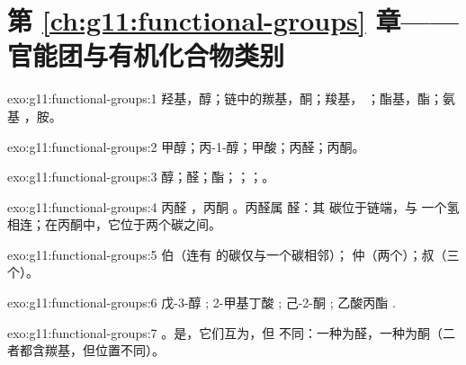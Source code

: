 \section*{第 \ref{ch:g11:functional-groups} 章——官能团与有机化合物类别}

\begin{solution}{exo:g11:functional-groups:1}
羟基，醇；链中的羰基，酮；羧基，
；酯基，酯；氨基 ，胺。
\end{solution}

\begin{solution}{exo:g11:functional-groups:2}
甲醇；丙-1-醇；甲酸；丙醛；丙酮。
\end{solution}

\begin{solution}{exo:g11:functional-groups:3}
醇；醛；酯；；；。
\end{solution}

\begin{solution}{exo:g11:functional-groups:4}
丙醛 ，丙酮 。丙醛属
醛：其  碳位于链端，与
一个氢相连；在丙酮中，它位于两个碳之间。
\end{solution}

\begin{solution}{exo:g11:functional-groups:5}
伯（连有  的碳仅与一个碳相邻）；
仲（两个）；叔（三个）。
\end{solution}

\begin{solution}{exo:g11:functional-groups:6}
戊-3-醇 ;
2-甲基丁酸 ;
己-2-酮 ;
乙酸丙酯 .
\end{solution}

\begin{solution}{exo:g11:functional-groups:7}
。是，它们互为，但
不同：一种为醛，一种为酮（二者都含羰基，但位置不同）。
\end{solution}

